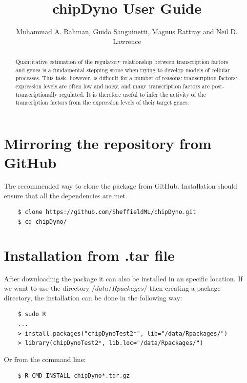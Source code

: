 \documentclass[11pt, a4paper, oneside]{article}
\title{chipDyno User Guide}
\author{Muhammad A. Rahman, Guido Sanguinetti, Magnus Rattray and Neil D. Lawrence}
\begin{document}


\maketitle

\begin{abstract}
Quantitative estimation of the regulatory relationship between transcription factors and genes is a fundamental stepping stone when trying to develop models of cellular processes. This task, however, is difficult for a number of reasons: transcription factors` expression levels are often low and noisy, and many transcription factors are post-transcriptionally regulated. It is therefore useful to infer the activity of the transcription factors from the expression levels of their target genes.
\end{abstract}

\tableofcontents


\section{Mirroring the  repository from GitHub}
The recommended way to clone the package from GitHub. 
Installation should ensure that all the dependencies are met.
 
\begin{verbatim}
    $ clone https://github.com/SheffieldML/chipDyno.git
    $ cd chipDyno/
\end{verbatim}

\section{Installation from .tar file}
After downloading the package it can also be installed in an specific location. 
If we want to use the directory $/data/Rpackages/$ then creating a package directory, 
the installation can be done in the following way:
\begin{verbatim}
    $ sudo R
    ...
    > install.packages("chipDynoTest2*", lib="/data/Rpackages/")
    > library(chipDynoTest2*, lib.loc="/data/Rpackages/")
\end{verbatim}

Or from the command line:
\begin{verbatim}
    $ R CMD INSTALL chipDyno*.tar.gz
\end{verbatim}



\end{document}
